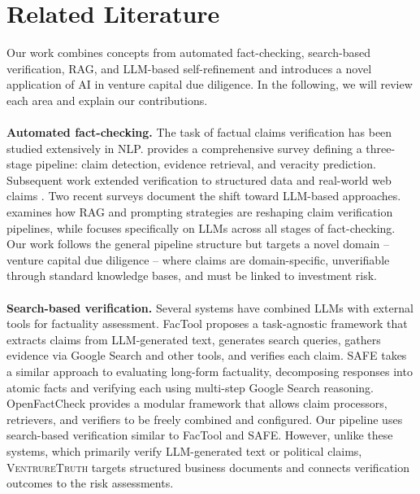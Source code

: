 \section{Related Literature}
Our work combines concepts from automated fact-checking, search-based verification, RAG, and LLM-based self-refinement and introduces a novel application of AI in venture capital due diligence. In the following, we will review each area and explain our contributions.
\\
\\
\textbf{Automated fact-checking.} The task of factual claims verification has been studied extensively in NLP. \citet{guo2022survey} provides a comprehensive survey defining a three-stage pipeline: claim detection, evidence retrieval, and veracity prediction. Subsequent work extended verification to structured data \citep{aly2021feverous} and real-world web claims \citep{schlichtkrull2024averitec}. Two recent surveys document the shift toward LLM-based approaches. \citet{dmonte2025claim} examines how RAG and prompting strategies are reshaping claim verification pipelines, while \citet{vykopal2024generative} focuses specifically on LLMs across all stages of fact-checking. Our work follows the general pipeline structure but targets a novel domain -- venture capital due diligence -- where claims are domain-specific, unverifiable through standard knowledge bases, and must be linked to investment risk.
\\
\\
\textbf{Search-based verification.} Several systems have combined LLMs with external tools for factuality assessment. FacTool \citep{chern2023factool} proposes a task-agnostic framework that extracts claims from LLM-generated text, generates search queries, gathers evidence via Google Search and other tools, and verifies each claim. SAFE \citep{wei2024longform} takes a similar approach to evaluating long-form factuality, decomposing responses into atomic facts and verifying each using multi-step Google Search reasoning. OpenFactCheck \citep{wang2024openfactcheck} provides a modular framework that allows claim processors, retrievers, and verifiers to be freely combined and configured. Our pipeline uses search-based verification similar to FacTool and SAFE. However, unlike these systems, which primarily verify LLM-generated text or political claims, \textsc{VentrureTruth} targets structured business documents and connects verification outcomes to the risk assessments.
\\
\\
